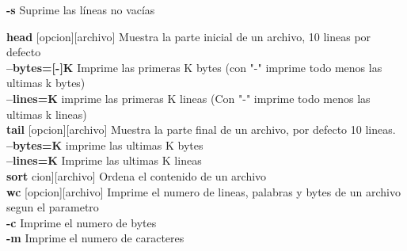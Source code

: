 \documentclass[11pt]{article}
\begin{document}
\hspace{2cm} \textbf{-s} \hspace{2cm} Suprime las líneas no vacías\\

\newpage

\textbf{head} [opcion][archivo]  Muestra la parte inicial de un archivo, 10 lineas por defecto \\



\hspace{2cm} \textbf{--bytes=[-]K} \hspace{2cm} Imprime las primeras K bytes (con "-" imprime todo menos las ultimas k bytes)
\\

\hspace{2cm} \textbf{--lines=K} \hspace{2cm} imprime las primeras K lineas (Con "-" imprime todo menos las ultimas k lineas)\\

\textbf{tail} [opcion][archivo] Muestra la parte final de un archivo, por defecto 10 lineas. \\

\hspace{2cm} \textbf{--bytes=K} \hspace{2cm} imprime las ultimas K bytes\\

\hspace{2cm} \textbf{--lines=K} \hspace{2cm} Imprime las ultimas K lineas \\

\textbf{sort} \hspace{2cm}cion][archivo] \hspace{2cm} Ordena el contenido de un archivo\\

\textbf{wc} [opcion][archivo] \hspace{2cm} Imprime el numero de lineas, palabras y bytes de un archivo segun el parametro \\

\hspace{2cm} \textbf{-c} \hspace{2cm} Imprime el numero de bytes\\

\hspace{2cm} \textbf{-m} \hspace{2cm} Imprime el numero de caracteres\\
\end{document}
